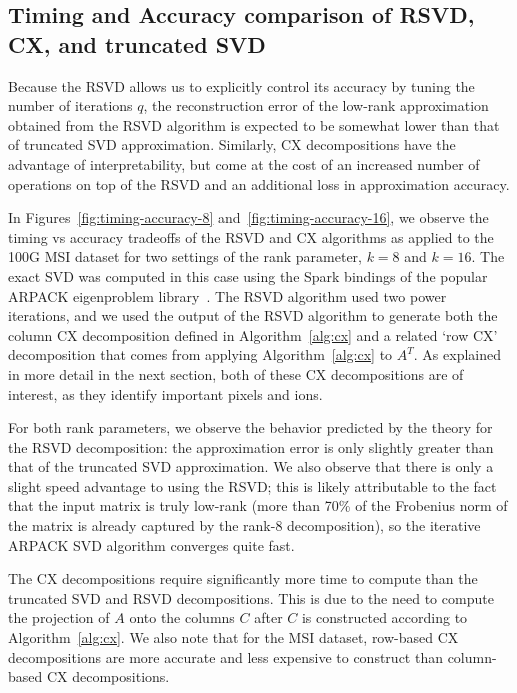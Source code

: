     
  

  
  \subsection{Timing and Accuracy comparison of RSVD, CX, and truncated SVD}

 Because the RSVD allows us to explicitly control its accuracy by tuning the number of iterations $q$,
 the reconstruction error of the low-rank approximation obtained from the RSVD
 algorithm is expected to be somewhat lower than that of truncated SVD
 approximation. Similarly, CX decompositions have the advantage of
 interpretability, but come at the cost of an increased number of operations on
 top of the RSVD and an additional loss in approximation accuracy. 

  In Figures~\ref{fig:timing-accuracy-8} and~\ref{fig:timing-accuracy-16}, we observe the timing vs accuracy tradeoffs of the RSVD and CX algorithms
  as applied to the 100G MSI dataset for two settings of the rank parameter, $k=8$ and $k=16.$ The exact SVD was computed in this case using the
  Spark bindings of the popular ARPACK eigenproblem library~\cite{ArpackUserGuide}. The RSVD algorithm used two power iterations, and we used the output of the RSVD algorithm to generate
  both the column CX decomposition defined in Algorithm~\ref{alg:cx} and a related `row CX' decomposition that comes from applying Algorithm~\ref{alg:cx}
  to $A^T.$ As explained in more detail in the next section, both of these CX decompositions are of interest, as they identify important pixels and ions.

  For both rank parameters, we observe the behavior predicted by the theory for the RSVD decomposition: the approximation error is only slightly greater than that of the 
  truncated SVD approximation. We also observe that there is only a slight speed advantage to using the RSVD; this is likely attributable to the fact that the input matrix
  is truly low-rank (more than 70\% of the Frobenius norm of the matrix is already captured by the rank-8 decomposition), so the iterative ARPACK SVD algorithm converges 
  quite fast.

  The CX decompositions require significantly more time to compute than the truncated SVD and RSVD decompositions. This is due to the need to compute the projection of $A$ onto
  the columns $C$ after $C$ is constructed according to Algorithm~\ref{alg:cx}. We also note that for the MSI dataset, row-based CX decompositions are more 
  accurate and less expensive to construct than column-based CX decompositions. 

